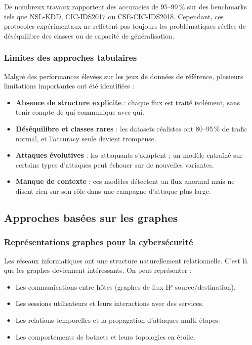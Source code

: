 ﻿\documentclass[11pt,a4paper]{article}
\begin{document}
De nombreux travaux rapportent des accuracies de 95--99\,\% sur des benchmarks tels que NSL-KDD, CIC-IDS2017 ou CSE-CIC-IDS2018. Cependant, ces protocoles expérimentaux ne reflètent pas toujours les problématiques réelles de déséquilibre des classes ou de capacité de généralisation.

\subsubsection{Limites des approches tabulaires}

Malgré des performances élevées sur les jeux de données de référence, plusieurs limitations importantes ont été identifiées :
\begin{itemize}
    \item \textbf{Absence de structure explicite} : chaque flux est traité isolément, sans tenir compte de qui communique avec qui.
    \item \textbf{Déséquilibre et classes rares} : les datasets réalistes ont 80--95\,\% de trafic normal, et l'accuracy seule devient trompeuse.
    \item \textbf{Attaques évolutives} : les attaquants s'adaptent ; un modèle entraîné sur certains types d'attaques peut échouer sur de nouvelles variantes.
    \item \textbf{Manque de contexte} : ces modèles détectent un flux anormal mais ne disent rien sur son rôle dans une campagne d'attaque plus large.
\end{itemize}

\subsection{Approches basées sur les graphes}

\subsubsection{Représentations graphes pour la cybersécurité}

Les réseaux informatiques ont une structure naturellement relationnelle. C'est là que les graphes deviennent intéressants. On peut représenter :
\begin{itemize}
    \item Les communications entre hôtes (graphes de flux IP source/destination).
    \item Les sessions utilisateurs et leurs interactions avec des services.
    \item Les relations temporelles et la propagation d'attaques multi-étapes.
    \item Les comportements de botnets et leurs topologies en étoile.
\end{itemize}
\end{document}
